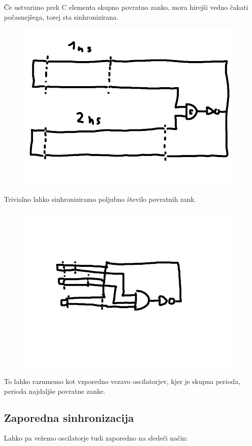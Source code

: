 Če ustvarimo prek C elementa skupno povratno zanko, mora hirejši vedno čakati počasnejšega, torej sta sinhronizirana.

\begin{figure}[H]
	\centering
	\includegraphics[width=0.7\linewidth]{slike/osnove/dly2}
	\caption{}
	\label{fig:celement}
\end{figure}

Trivialno lahko sinhroniziramo poljubno število povratnih zank.

\begin{figure}[H]
	\centering
	\includegraphics[width=0.7\linewidth]{slike/osnove/dly3}
	\caption{}
	\label{fig:celement}
\end{figure}

To lahko razumemo kot vzporedno vezavo oscilatorjev, kjer je skupna perioda, perioda najdaljše povratne zanke. 

\subsection{Zaporedna sinhronizacija} \label{c}
Lahko pa vežemo oscilatorje tudi zaporedno na sledeči način:


